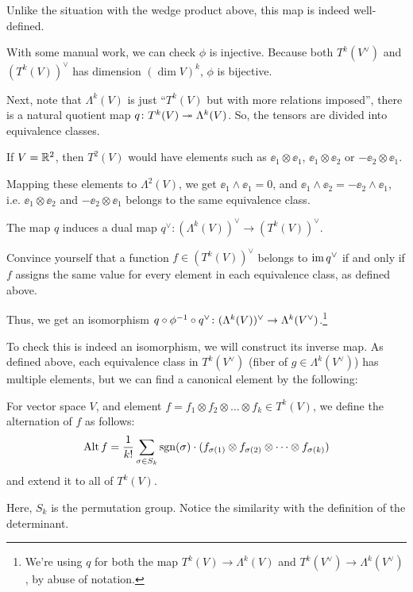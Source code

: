Unlike the situation with the wedge product above, this map is indeed well-defined.

With some manual work, we can check $\phi$ is injective. Because both $T^k(V^\vee)$ and
$(T^k(V))^\vee$ has dimension $(\dim V)^k$, $\phi$ is bijective.

Next, note that $\Lambda^k(V)$ is just ``$T^k(V)$ but with more relations imposed'',
there is a natural quotient map $q \colon T^k(V) \twoheadrightarrow \Lambda^k(V)$.
So, the tensors are divided into equivalence classes.
\begin{example}
	If $V = \mathbb R^2$, then $T^2(V)$ would have elements such as $\ee_1 \otimes \ee_1$, $\ee_1 \otimes
	\ee_2$ or $-\ee_2 \otimes \ee_1$.

	Mapping these elements to $\Lambda^2(V)$, we get $\ee_1 \wedge \ee_1 = 0$, and $\ee_1 \wedge
	\ee_2 = -\ee_2 \wedge \ee_1$, i.e. $\ee_1 \otimes \ee_2$ and $-\ee_2 \otimes \ee_1$ belongs to
	the same equivalence class.
\end{example}

The map $q$ induces a dual map $q^\vee \colon (\Lambda^k(V))^\vee \to (T^k(V))^\vee$.
\begin{ques}
	Convince yourself that a function $f \in (T^k(V))^\vee$ belongs to $\operatorname{im} q^\vee$ if and only if
	$f$ assigns the same value for every element in each equivalence class, as defined above.
\end{ques}

Thus, we get an isomorphism $q \circ \phi^{-1} \circ q^\vee \colon (\Lambda^k(V))^\vee \to
\Lambda^k(V^\vee)$.\footnote{We're using $q$ for both the map $T^k(V) \to \Lambda^k(V)$ and
$T^k(V^\vee) \to \Lambda^k(V^\vee)$, by abuse of notation.}

To check this is indeed an isomorphism, we will construct its inverse map.
As defined above, each equivalence class in $T^k(V^\vee)$ (fiber of $g \in \Lambda^k(V^\vee)$)
has multiple elements, but we can find a canonical element by the following:
\begin{definition}
	For vector space $V$, and element $f = f_1 \otimes f_2 \otimes \dots \otimes f_k \in T^k(V)$,
	we define the alternation of $f$ as follows:
	\[ \operatorname{Alt} f = \frac{1}{k!} \sum_{\sigma \in S_k} \operatorname{sgn}(\sigma) \cdot
	(f_{\sigma(1)} \otimes f_{\sigma(2)} \otimes \dots \otimes f_{\sigma(k)}) \]
	and extend it to all of $T^k(V)$.
\end{definition}
Here, $S_k$ is the permutation group. Notice the similarity with the definition of the determinant.


